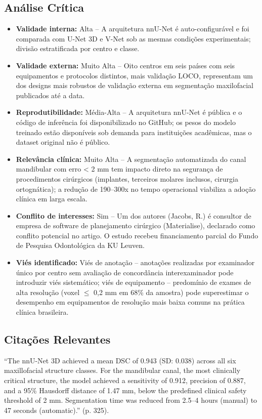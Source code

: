 \subsection{Análise Crítica}
\begin{itemize}
  \item \textbf{Validade interna:} Alta -- A arquitetura nnU-Net é
        auto-configurável e foi comparada com U-Net 3D e V-Net sob as
        mesmas condições experimentais; divisão estratificada por
        centro e classe.
  \item \textbf{Validade externa:} Muito Alta -- Oito centros em seis
        países com seis equipamentos e protocolos distintos, mais
        validação LOCO, representam um dos designs mais robustos de
        validação externa em segmentação maxilofacial publicados até
        a data.
  \item \textbf{Reprodutibilidade:} Média-Alta -- A arquitetura nnU-Net
        é pública e o código de inferência foi disponibilizado no
        GitHub; os pesos do modelo treinado estão disponíveis sob
        demanda para instituições acadêmicas, mas o dataset original
        não é público.
  \item \textbf{Relevância clínica:} Muito Alta -- A segmentação
        automatizada do canal mandibular com erro < 2 mm tem impacto
        direto na segurança de procedimentos cirúrgicos (implantes,
        terceiros molares inclusos, cirurgia ortognática); a redução
        de 190--300x no tempo operacional viabiliza a adoção clínica
        em larga escala.
  \item \textbf{Conflito de interesses:} Sim -- Um dos autores (Jacobs,
        R.) é consultor de empresa de software de planejamento
        cirúrgico (Materialise), declarado como conflito potencial no
        artigo. O estudo recebeu financiamento parcial do Fundo de
        Pesquisa Odontológica da KU Leuven.
  \item \textbf{Viés identificado:} Viés de anotação -- anotações
        realizadas por examinador único por centro sem avaliação de
        concordância interexaminador pode introduzir viés sistemático;
        viés de equipamento -- predomínio de exames de alta resolução
        (voxel $\leq$ 0,2 mm em 68\% da amostra) pode superestimar o
        desempenho em equipamentos de resolução mais baixa comuns na
        prática clínica brasileira.
\end{itemize}

\subsection{Citações Relevantes}
\begin{citacao}
``The nnU-Net 3D achieved a mean DSC of 0.943 (SD: 0.038) across all six
maxillofacial structure classes. For the mandibular canal, the most
clinically critical structure, the model achieved a sensitivity of 0.912,
precision of 0.887, and a 95\% Hausdorff distance of 1.47 mm, below the
predefined clinical safety threshold of 2 mm. Segmentation time was
reduced from 2.5--4 hours (manual) to 47 seconds (automatic).''
(p. 325).
\end{citacao}


